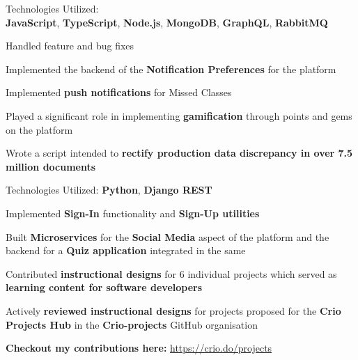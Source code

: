 \documentclass[]{deedy-resume-openfont}
\begin{document}
\begin{minipage}[t]{0.66\textwidth}
\sectionsep

\sectionsep
\begin{tightemize}
\item Technologies Utilized: \\\textbf{JavaScript}, \textbf{TypeScript}, \textbf{Node.js}, \textbf{MongoDB}, \textbf{GraphQL}, \textbf{RabbitMQ}
\item Handled feature and bug fixes
\item Implemented the backend of the \textbf{Notification Preferences} for the platform
\item Implemented \textbf{push notifications} for Missed Classes
\item Played a significant role in implementing \textbf{gamification} through points and gems on the platform
\item Wrote a script intended to \textbf{rectify production data discrepancy in over 7.5 million documents}
\end{tightemize}

\begin{tightemize}
\item Technologies Utilized: \textbf{Python}, \textbf{Django REST}
\item Implemented \textbf{Sign-In} functionality and \textbf{Sign-Up utilities}
\item Built \textbf{Microservices} for the \textbf{Social Media} aspect of the platform and the backend for a \textbf{Quiz application} integrated in the same
\end{tightemize}

\begin{tightemize}
\item Contributed \textbf{instructional designs} for 6 individual projects which served as \textbf{learning content for software developers}
\item Actively \textbf{reviewed instructional designs} for projects proposed for the \textbf{Crio Projects Hub} in the \textbf{Crio-projects} GitHub organisation
\item \textbf{Checkout my contributions here:} \href{https://crio.do/projects}{https://crio.do/projects}
\end{tightemize}


\end{minipage}
\end{document}
